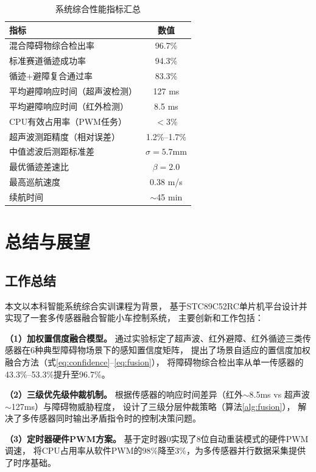 \documentclass[12pt,a4paper]{ctexart}
\begin{document}
\begin{table}[H]
\centering
\caption{系统综合性能指标汇总}
\label{tab:summary}
\begin{tabular}{lc}
\toprule
\textbf{指标} & \textbf{数值} \\
\midrule
混合障碍物综合检出率 & 96.7\% \\
标准赛道循迹成功率 & 94.3\% \\
循迹+避障复合通过率 & 83.3\% \\
平均避障响应时间（超声波检测）& 127 ms \\
平均避障响应时间（红外检测）& 8.5 ms \\
CPU有效占用率（PWM任务）& $<$3\% \\
超声波测距精度（相对误差）& 1.2\%--1.7\% \\
中值滤波后测距标准差 & $\sigma=5.7$mm \\
最优循迹差速比 & $\beta=2.0$ \\
最高巡航速度 & 0.38 m/s \\
续航时间 & $\sim$45 min \\
\bottomrule
\end{tabular}
\end{table}

\section{总结与展望}

\subsection{工作总结}

本文以本科智能系统综合实训课程为背景，
基于STC89C52RC单片机平台设计并实现了一套多传感器融合智能小车控制系统，
主要创新和工作包括：

\textbf{（1）加权置信度融合模型。}
通过实验标定了超声波、红外避障、红外循迹三类传感器在6种典型障碍物场景下的感知置信度矩阵，
提出了场景自适应的置信度加权融合方法（式\ref{eq:confidence}--\ref{eq:fusion}），
将障碍物综合检出率从单一传感器的43.3\%--53.3\%提升至96.7\%。

\textbf{（2）三级优先级仲裁机制。}
根据传感器的响应时间差异（红外$\sim$8.5ms vs 超声波$\sim$127ms）与障碍物威胁程度，
设计了三级分层仲裁策略（算法\ref{alg:fusion}），
解决了多传感器同时输出矛盾指令时的控制决策问题。

\textbf{（3）定时器硬件PWM方案。}
基于定时器0实现了8位自动重装模式的硬件PWM调速，
将CPU占用率从软件PWM的98\%降至3\%，为多传感器并行数据采集提供了时序基础。
\end{document}
